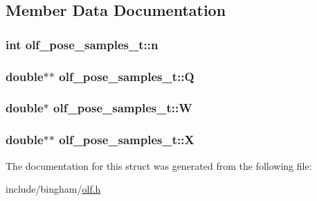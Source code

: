 \subsection{Member Data Documentation}
\hypertarget{structolf__pose__samples__t_a26dc2afb24ba13c4efe49d4c75cf52a2}{
\subsubsection[{n}]{\setlength{\rightskip}{0pt plus 5cm}int {\bf olf\_\-pose\_\-samples\_\-t::n}}}
\label{structolf__pose__samples__t_a26dc2afb24ba13c4efe49d4c75cf52a2}
\hypertarget{structolf__pose__samples__t_a2625674be57ee0188d1ff0d28cdd55d7}{
\subsubsection[{Q}]{\setlength{\rightskip}{0pt plus 5cm}double$\ast$$\ast$ {\bf olf\_\-pose\_\-samples\_\-t::Q}}}
\label{structolf__pose__samples__t_a2625674be57ee0188d1ff0d28cdd55d7}
\hypertarget{structolf__pose__samples__t_a3be0f7272463bba2a01c3bf0f7e20412}{
\subsubsection[{W}]{\setlength{\rightskip}{0pt plus 5cm}double$\ast$ {\bf olf\_\-pose\_\-samples\_\-t::W}}}
\label{structolf__pose__samples__t_a3be0f7272463bba2a01c3bf0f7e20412}
\hypertarget{structolf__pose__samples__t_a1ad30c2edd5fcfca674a0aaf44c5bb3b}{
\subsubsection[{X}]{\setlength{\rightskip}{0pt plus 5cm}double$\ast$$\ast$ {\bf olf\_\-pose\_\-samples\_\-t::X}}}
\label{structolf__pose__samples__t_a1ad30c2edd5fcfca674a0aaf44c5bb3b}


The documentation for this struct was generated from the following file:\begin{DoxyCompactItemize}
\item 
include/bingham/\hyperlink{olf_8h}{olf.h}\end{DoxyCompactItemize}
